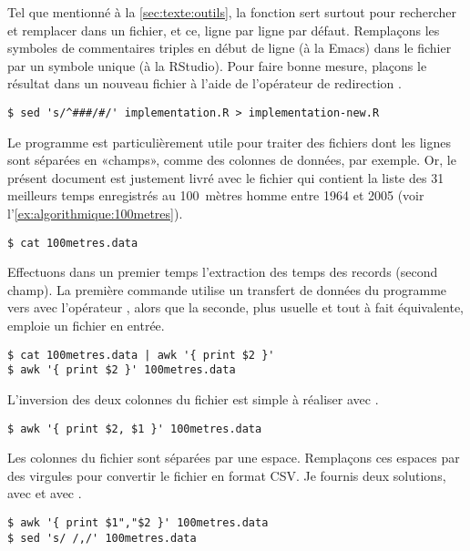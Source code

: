 Tel que mentionné à la \autoref{sec:texte:outils}, la fonction
 sert surtout pour rechercher et remplacer dans un fichier,
et ce, ligne par ligne par défaut. Remplaçons les symboles de
commentaires triples \code{\#\#\#} en début de ligne (à la Emacs) dans
le fichier  par un symbole unique \code{\#} (à
la RStudio). Pour faire bonne mesure, plaçons le résultat dans un
nouveau fichier  à l'aide de l'opérateur de
redirection \code{>}.
\begin{Schunk}
\begin{Verbatim}
$ sed 's/^###/#/' implementation.R > implementation-new.R
\end{Verbatim}
\end{Schunk}

Le programme  est particulièrement utile pour traiter des
fichiers dont les lignes sont séparées en «champs», comme des colonnes
de données, par exemple. Or, le présent document est justement livré
avec le fichier  qui contient la liste des 31
meilleurs temps enregistrés au 100~mètres homme entre 1964 et 2005
(voir l'\autoref{ex:algorithmique:100metres}).
\begin{Schunk}
\begin{Verbatim}
$ cat 100metres.data
\end{Verbatim}
\end{Schunk}

Effectuons dans un premier temps l'extraction des temps des records
(second champ). La première commande utilise un transfert de données
du programme  vers  avec l'opérateur %
\code{\textbar}, alors
que la seconde, plus usuelle et tout à fait équivalente, emploie un
fichier en entrée.
\begin{Schunk}
\begin{Verbatim}
$ cat 100metres.data | awk '{ print $2 }'
$ awk '{ print $2 }' 100metres.data
\end{Verbatim}
\end{Schunk}

L'inversion des deux colonnes du fichier est simple à réaliser avec
.
\begin{Schunk}
\begin{Verbatim}
$ awk '{ print $2, $1 }' 100metres.data
\end{Verbatim}
\end{Schunk}

Les colonnes du fichier  sont séparées par une
espace. Remplaçons ces espaces par des virgules pour convertir le
fichier en format CSV. Je fournis deux solutions, avec  et avec
.
\begin{Schunk}
\begin{Verbatim}
$ awk '{ print $1","$2 }' 100metres.data
$ sed 's/ /,/' 100metres.data
\end{Verbatim}
\end{Schunk}

